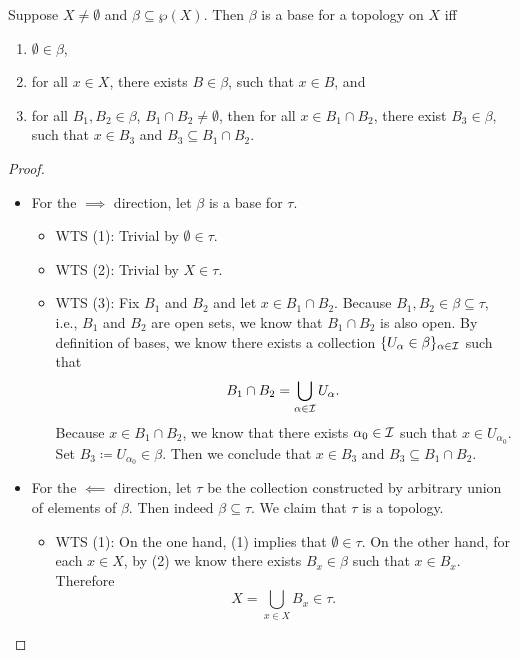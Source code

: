 \documentclass{techreport}
\begin{document}
\begin{proposition}\label{Prop:BaseStructure}
	Suppose $X \neq \emptyset$ and $\beta \subseteq \wp(X)$.
	Then $\beta$ is a base for a topology on $X$ iff
	\begin{enumerate}
		\item $\emptyset \in \beta$,
		\item for all $x \in X$, there exists $B \in \beta$, such that $x \in B$, and
		\item for all $B_1,B_2 \in \beta$, $B_1 \cap B_2 \neq \emptyset$, then for all $x \in B_1 \cap B_2$, there exist $B_3 \in \beta$, such that $x \in B_3$ and $B_3 \subseteq B_1 \cap B_2$.
	\end{enumerate}
\end{proposition}
\begin{proof}
	\begin{itemize}
		\item For the ${\implies}$ direction, let $\beta$ is a base for $\tau$.
		\begin{itemize}
			\item WTS (1): Trivial by $\emptyset \in \tau$.
			\item WTS (2): Trivial by $X \in \tau$.
			\item WTS (3): Fix $B_1$ and $B_2$ and let $x \in B_1 \cap B_2$.
			Because $B_1,B_2 \in \beta \subseteq \tau$, i.e., $B_1$ and $B_2$ are open sets, we know that $B_1 \cap B_2$ is also open.
			By definition of bases, we know there exists a collection $\{U_\alpha \in \beta\}_{\alpha \in \mathcal{I}}$ such that
			\[
			B_1 \cap B_2 = \bigcup_{\alpha \in \mathcal{I}} U_\alpha.
			\]
			Because $x \in B_1 \cap B_2$, we know that there exists $\alpha_0 \in \mathcal{I}$ such that $x \in U_{\alpha_0}$.
			Set $B_3 \coloneqq U_{\alpha_0} \in \beta$.
			Then we conclude that $x \in B_3$ and $B_3 \subseteq B_1 \cap B_2$.
		\end{itemize}
		
		\item For the ${\impliedby}$ direction, let $\tau$ be the collection constructed by arbitrary union of elements of $\beta$.
		Then indeed $\beta \subseteq \tau$.
		We claim that $\tau$ is a topology.
		\begin{itemize}
			\item WTS (1): On the one hand, (1) implies that $\emptyset \in \tau$.
			On the other hand, for each $x \in X$, by (2) we know there exists $B_x \in \beta$ such that $x \in B_x$.
			Therefore
			\[
			X = \bigcup_{x \in X} B_x \in \tau.
			\]
			

\end{itemize}
\end{itemize}
\end{proof}
\end{document}
